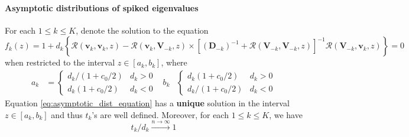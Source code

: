 \documentclass[twoside]{article}
\begin{document}
\paragraph*{Asymptotic distributions of spiked eigenvalues} For each $1\leq k \leq K$, denote the solution to the equation 
\begin{equation}\label{eq:asymptotic_dist_equation}
    f_k(z) = 1 + d_k \left\{ \mathcal{R}(\mathbf{v}_k,\mathbf{v}_k,z)-\mathcal{R}(\mathbf{v}_k,\mathbf{V}_{-k},z) \times \left[(\mathbf{D}_{-k})^{-1}+ \mathcal{R}(\mathbf{V}_{-k},\mathbf{V}_{-k},z)\right]^{-1}\mathcal{R}\left(\mathbf{V}_{-k},\mathbf{v}_k,z\right) \right\} = 0
\end{equation}
when restricted to the interval $z\in \left[a_k,b_k\right]$, where 
\begin{align*}
    a_k &= \begin{cases}
        d_k/(1+c_0/2) & d_k > 0 \\
        d_k(1+c_0/2) & d_k < 0
    \end{cases}
    & b_k & \begin{cases}
        d_k(1+c_0/2) & d_k >0 \\
        d_k/(1+c_0/2) & d_k <0
    \end{cases}
\end{align*}
Equation \ref{eq:asymptotic_dist_equation} has a \textbf{unique} solution in the interval $z\in\left[a_k,b_k\right]$ and thus $t_k$'s are well defined. Moreover, for each $1\leq k \leq K$, we have $$ t_k/d_k \xrightarrow{n\rightarrow\infty} 1 $$
\end{document}
